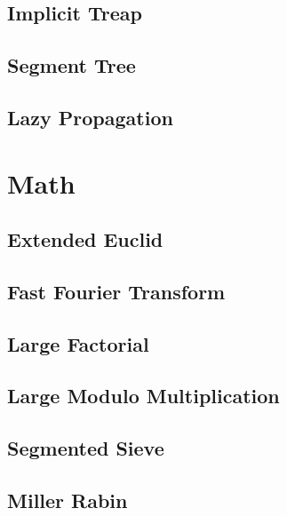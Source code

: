 \subsection{Implicit Treap}
\raggedbottom
\hrulefill
\subsection{Segment Tree}
\raggedbottom
\hrulefill
\subsection{Lazy Propagation}
\raggedbottom
\hrulefill

\section{Math}
\subsection{Extended Euclid}
\raggedbottom
\hrulefill
\subsection{Fast Fourier Transform}
\raggedbottom
\hrulefill
\subsection{Large Factorial}
\raggedbottom
\hrulefill
\subsection{Large Modulo Multiplication}
\raggedbottom
\hrulefill
\subsection{Segmented Sieve}
\raggedbottom
\hrulefill
\subsection{Miller Rabin}
\raggedbottom
\hrulefill

